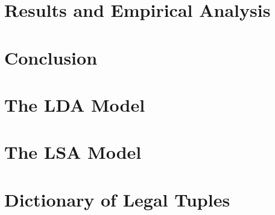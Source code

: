 \documentclass[12pt,english,draft]{article}
\begin{document}
\section{Results and Empirical Analysis}







\section{Conclusion}




\begin{appendices}


\section{The LDA Model}

\section{The LSA Model}

\section{Dictionary of Legal Tuples}

\end{appendices}


\newpage
{


}
\end{document}
